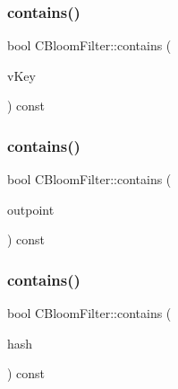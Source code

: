 \mbox{\label{class_c_bloom_filter_afe62e10a4c4cf64e18a2a659d0bcc31b}} 
\subsubsection{\texorpdfstring{contains()}{contains()}\hspace{0.1cm}{\footnotesize\ttfamily [1/3]}}
{\footnotesize\ttfamily bool C\+Bloom\+Filter\+::contains (\begin{DoxyParamCaption}\item[{const std\+::vector$<$ unsigned char $>$ \&}]{v\+Key }\end{DoxyParamCaption}) const}

\mbox{\label{class_c_bloom_filter_af4557c3253f218eaf13e6d7da53e20e9}} 
\subsubsection{\texorpdfstring{contains()}{contains()}\hspace{0.1cm}{\footnotesize\ttfamily [2/3]}}
{\footnotesize\ttfamily bool C\+Bloom\+Filter\+::contains (\begin{DoxyParamCaption}\item[{const C\+Out\+Point \&}]{outpoint }\end{DoxyParamCaption}) const}

\mbox{\label{class_c_bloom_filter_a4c26810781cdc0fd34443f32612ac83b}} 
\subsubsection{\texorpdfstring{contains()}{contains()}\hspace{0.1cm}{\footnotesize\ttfamily [3/3]}}
{\footnotesize\ttfamily bool C\+Bloom\+Filter\+::contains (\begin{DoxyParamCaption}\item[{const \mbox{\hyperlink{classuint256}{uint256}} \&}]{hash }\end{DoxyParamCaption}) const}

